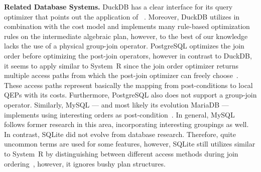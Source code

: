 \textbf{Related Database Systems.}
DuckDB has a clear interface for its query optimizer that points out the application of \split~\cite{duckdb}.  Moreover, DuckDB utilizes \DPccp in combination with the cost model \Cout and implements many rule-based optimization rules on the intermediate algebraic plan, however, to the best of our knowledge lacks the use of a physical group-join operator.
PostgreSQL optimizes the join order before optimizing the post-join operators, however in contrast to DuckDB, it seems to apply \holistic similar to System~R since the join order optimizer returns multiple access paths from which the post-join optimizer can freely choose~\cite{postgres}.  These access paths represent basically the mapping from post-conditions to local QEPs with its costs.   Furthermore, PostgreSQL also does not support a group-join operator.
Similarly, MySQL --- and most likely its evolution MariaDB --- implements \holistic using interesting orders as post-condition~\cite{mysql}.  In general, MySQL follows former research in this area, \eg incorporating interesting groupings as well.
In contrast, SQLite did not evolve from database research.  Therefore, quite uncommon terms are used for some features, however, SQLite still utilizes \holistic similar to System~R by distinguishing between different access methods during join ordering~\cite{sqlite}, however, it ignores bushy plan structures.
